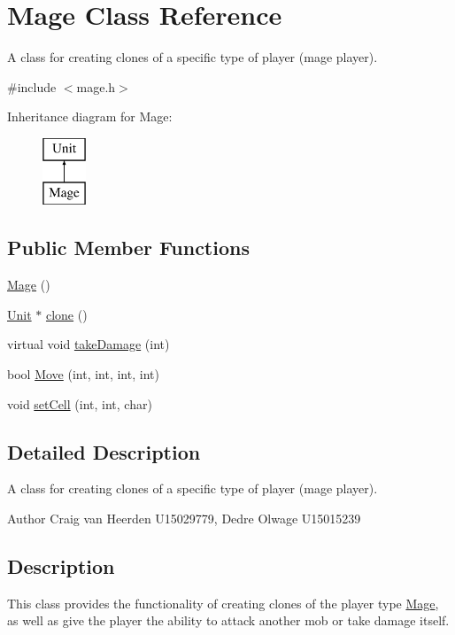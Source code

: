 \hypertarget{class_mage}{\section{\-Mage \-Class \-Reference}
\label{class_mage}
}


\-A class for creating clones of a specific type of player (mage player).  




{\ttfamily \#include $<$mage.\-h$>$}

\-Inheritance diagram for \-Mage\-:\begin{figure}[H]
\begin{center}
\leavevmode
\includegraphics[height=2.000000cm]{class_mage}
\end{center}
\end{figure}
\subsection*{\-Public \-Member \-Functions}
\begin{DoxyCompactItemize}
\item 
\hyperlink{class_mage_a9d7d4455a6fa1f8e35117e0dc301d082}{\-Mage} ()
\item 
\hyperlink{class_unit}{\-Unit} $\ast$ \hyperlink{class_mage_a912add3131e2e6526f152938eb3d4193}{clone} ()
\item 
virtual void \hyperlink{class_mage_adcdb524ec97442ba0f55f9e5d62bb917}{take\-Damage} (int)
\item 
bool \hyperlink{class_mage_a25e48415ef4a906e169c2d23d770bd1b}{\-Move} (int, int, int, int)
\item 
void \hyperlink{class_mage_a86ed962ea9f6051a82e342c2b618b3c2}{set\-Cell} (int, int, char)
\end{DoxyCompactItemize}


\subsection{\-Detailed \-Description}
\-A class for creating clones of a specific type of player (mage player). 

\begin{DoxyAuthor}{\-Author}
\-Craig van \-Heerden \-U15029779, \-Dedre \-Olwage \-U15015239
\end{DoxyAuthor}
\hypertarget{class_unit_factory_Description}{}\subsection{\-Description}\label{class_unit_factory_Description}
\-This class provides the functionality of creating clones of the player type \hyperlink{class_mage}{\-Mage}, as well as give the player the ability to attack another mob or take damage itself. 

